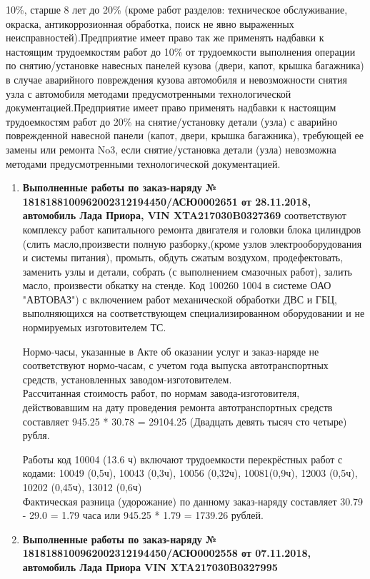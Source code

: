 10\%, старше 8 лет до 20\% (кроме работ разделов: техническое обслуживание, окраска, антикоррозионная обра­ботка, поиск не явно выраженных неисправностей).Предприятие имеет право так же применять надбавки к настоящим трудоемкостям работ до  10\% от трудоемко­сти выполнения операции по снятию/установке навесных панелей кузова (двери, капот, крышка багажника) в слу­чае аварийного повреждения кузова автомобиля и невозможности снятия узла с автомобиля методами предусмот­ренными технологической документацией.Предприятие имеет право применять надбавки к настоящим трудоемкостям работ до  20\%  на снятие/установку детали (узла) с аварийно поврежденной навесной панели (капот, двери, крышка багажника), требующей ее замены или ремонта No3, если снятие/установка детали (узла) невозможна методами предусмотренными технологической документацией.


\begin{enumerate}
	\item \par\textbf{{ Выполненные работы по заказ-наряду № 1818188100962002312194450/АСЮ0002651 от 28.11.2018, автомобиль Лада Приора, VIN XTA217030B0327369}} соответствуют комплексу работ капитального ремонта двигателя и головки блока цилиндров  (слить масло,произвести полную разборку,(кроме узлов электрооборудования и системы питания), промыть, обдуть сжатым воздухом, продефектовать, заменить узлы и детали, собрать (с выполнением смазочных работ), залить масло, произвести обкатку на стенде. Код 100260 1004 в системе ОАО "АВТОВАЗ") с включением работ механической обработки ДВС и ГБЦ, выполняющихся на соответствующем специализированном оборудовании и   не нормируемых изготовителем ТС.\\


Нормо-часы, указанные в Акте об оказании услуг и заказ-наряде не соответствуют нормо-часам, с учетом года выпуска автотранспортных средств, установленных заводом-изготовителем.\\
Рассчитанная стоимость работ, по нормам завода-изготовителя, действовавшим на дату проведения ремонта автотранспортных средств составляет 945.25 * 30.78 =
29104.25 (Двадцать девять тысяч сто четыре) рубля.

Работы код 10004 (13.6 ч)  включают трудоемкости перекрёстных  работ с кодами:  10049 (0,5ч), 10043 (0,3ч), 10056 (0,32ч),  10081(0,9ч), 12003 (0,5ч), 10202 (0,45ч), 13012 (0,6ч)\\
Фактическая разница (удорожание)  по данному заказ-наряду составляет 30.79 - 29.0 = 1.79 часа или  945.25 * 1.79 = 1739.26 рублей.


\item \par\textbf{{ Выполненные работы по заказ-наряду № 1818188100962002312194450/АСЮ0002558 от 07.11.2018, автомобиль Лада Приора  VIN XTA217030B0327995}}




\end{enumerate}

